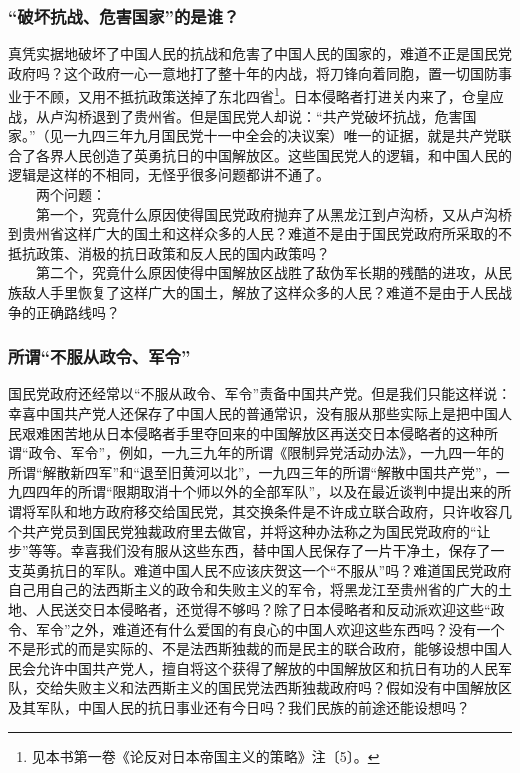 \documentclass[cn,11pt,chinese]{elegantbook}
\def\myformat#1{\hfil\hfil #1}
\begin{document}
\subsubsection*{\myformat{“破坏抗战、危害国家”的是谁？}}
真凭实据地破坏了中国人民的抗战和危害了中国人民的国家的，难道不正是国民党政府吗？这个政府一心一意地打了整十年的内战，将刀锋向着同胞，置一切国防事业于不顾，又用不抵抗政策送掉了东北四省\footnote[11]{ 见本书第一卷《论反对日本帝国主义的策略》注〔5〕。}。日本侵略者打进关内来了，仓皇应战，从卢沟桥退到了贵州省。但是国民党人却说：“共产党破坏抗战，危害国家。”（见一九四三年九月国民党十一中全会的决议案）唯一的证据，就是共产党联合了各界人民创造了英勇抗日的中国解放区。这些国民党人的逻辑，和中国人民的逻辑是这样的不相同，无怪乎很多问题都讲不通了。\\
　　两个问题：\\
　　第一个，究竟什么原因使得国民党政府抛弃了从黑龙江到卢沟桥，又从卢沟桥到贵州省这样广大的国土和这样众多的人民？难道不是由于国民党政府所采取的不抵抗政策、消极的抗日政策和反人民的国内政策吗？\\
　　第二个，究竟什么原因使得中国解放区战胜了敌伪军长期的残酷的进攻，从民族敌人手里恢复了这样广大的国土，解放了这样众多的人民？难道不是由于人民战争的正确路线吗？\\
\subsubsection*{\myformat{所谓“不服从政令、军令”}}
国民党政府还经常以“不服从政令、军令”责备中国共产党。但是我们只能这样说：幸喜中国共产党人还保存了中国人民的普通常识，没有服从那些实际上是把中国人民艰难困苦地从日本侵略者手里夺回来的中国解放区再送交日本侵略者的这种所谓“政令、军令”，例如，一九三九年的所谓《限制异党活动办法》，一九四一年的所谓“解散新四军”和“退至旧黄河以北”，一九四三年的所谓“解散中国共产党”，一九四四年的所谓“限期取消十个师以外的全部军队”，以及在最近谈判中提出来的所谓将军队和地方政府移交给国民党，其交换条件是不许成立联合政府，只许收容几个共产党员到国民党独裁政府里去做官，并将这种办法称之为国民党政府的“让步”等等。幸喜我们没有服从这些东西，替中国人民保存了一片干净土，保存了一支英勇抗日的军队。难道中国人民不应该庆贺这一个“不服从”吗？难道国民党政府自己用自己的法西斯主义的政令和失败主义的军令，将黑龙江至贵州省的广大的土地、人民送交日本侵略者，还觉得不够吗？除了日本侵略者和反动派欢迎这些“政令、军令”之外，难道还有什么爱国的有良心的中国人欢迎这些东西吗？没有一个不是形式的而是实际的、不是法西斯独裁的而是民主的联合政府，能够设想中国人民会允许中国共产党人，擅自将这个获得了解放的中国解放区和抗日有功的人民军队，交给失败主义和法西斯主义的国民党法西斯独裁政府吗？假如没有中国解放区及其军队，中国人民的抗日事业还有今日吗？我们民族的前途还能设想吗？\\
\end{document}
